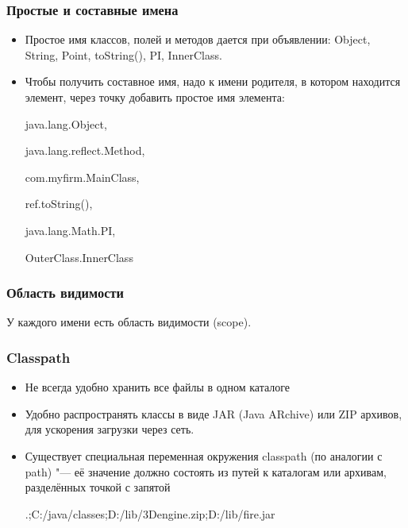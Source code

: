 \documentclass[default]{beamer}
\begin{document}
	\begin{frame}
		\frametitle{Простые и составные имена}
		
		\begin{itemize}
			\item Простое имя классов, полей и методов дается при объявлении: Object, String, Point, toString(), PI, InnerClass.
			\item Чтобы получить составное имя, надо к имени родителя, в котором находится элемент, через точку добавить простое имя элемента:
			
			java.lang.Object, 
			
			java.lang.reflect.Method, 
			
			com.myfirm.MainClass, 
			
			ref.toString(), 
			
			java.lang.Math.PI, 
			
			OuterClass.InnerClass
		\end{itemize}
	\end{frame}


	\begin{frame}
		\frametitle{Область видимости}
		
		У каждого имени есть область видимости (scope).
		
		\lstScope
	\end{frame}

	\begin{frame}
		\frametitle{Classpath}
		
		\begin{itemize}
			\item Не всегда удобно хранить все файлы в одном каталоге
			\item Удобно распространять классы в виде JAR (Java ARchive) или ZIP архивов, для ускорения загрузки через сеть.
			\item Существует специальная переменная окружения classpath (по аналогии с path) "--- её значение должно состоять из путей к каталогам или архивам, разделённых точкой с запятой
			
			.;C:/java/classes;D:/lib/3Dengine.zip;D:/lib/fire.jar
		\end{itemize}
	\end{frame}
\end{document}
